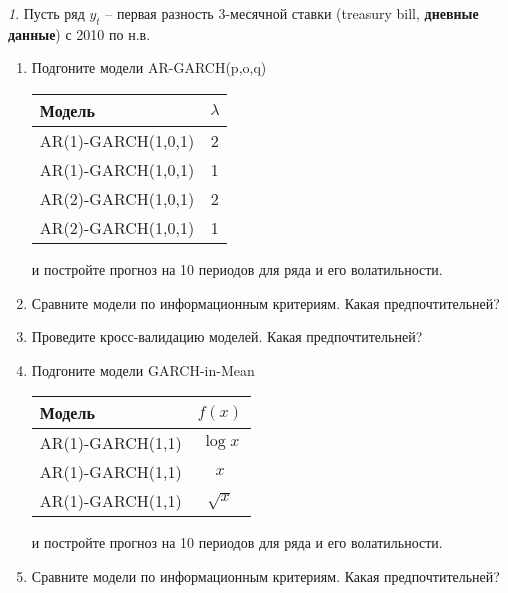 \documentclass[12pt]{article}
\theoremstyle{remark}
\newtheorem{exercise}{}[subsection]
\begin{document}
\begin{exercise}
Пусть ряд \(y_t\) -- первая разность 3-месячной ставки (treasury bill, \textbf{дневные данные}) с 2010 по н.в.
\begin{enumerate}
	\item Подгоните модели AR-GARCH(p,o,q)
	\begin{center}
	\begin{tabular}{l|c}
		Модель & \(\lambda\) \\ \hline
		AR(1)-GARCH(1,0,1) & 2 \\
		AR(1)-GARCH(1,0,1) & 1 \\
		AR(2)-GARCH(1,0,1) & 2 \\
		AR(2)-GARCH(1,0,1) & 1 \\ \hline
	\end{tabular}
	\end{center} 
	и постройте прогноз на 10 периодов для ряда и его волатильности.
	\item Сравните модели по информационным критериям. Какая предпочтительней?
	\item Проведите кросс-валидацию моделей. Какая предпочтительней?
	\item Подгоните модели GARCH-in-Mean
	\begin{center}
		\begin{tabular}{l|c}
			Модель & \(f(x)\) \\ \hline
			AR(1)-GARCH(1,1) & \(\log x\) \\
			AR(1)-GARCH(1,1) & \(x\) \\
			AR(1)-GARCH(1,1) & \(\sqrt{x}\) \\
		\end{tabular}
	\end{center} 
	и постройте прогноз на 10 периодов для ряда и его волатильности.
	\item Сравните модели по информационным критериям. Какая предпочтительней?
\end{enumerate}
\end{exercise}
\end{document}
